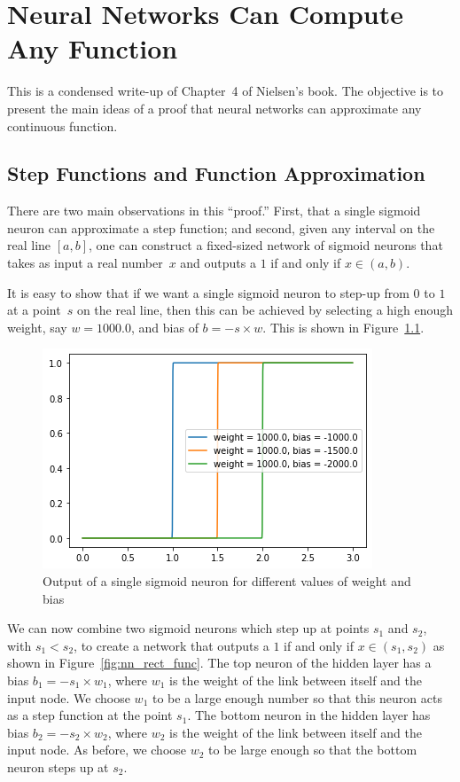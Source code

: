 \chapter{Neural Networks Can Compute Any Function}


This is a condensed write-up of Chapter~4 of Nielsen's book. The objective is 
to present the main ideas of a proof that neural networks can approximate 
any continuous function.

\section{Step Functions and Function Approximation}

There are two main observations in this ``proof.'' First, that a single 
sigmoid neuron can approximate a step function; and second, given 
any interval on the real line $[a, b]$, one can construct a 
fixed-sized network of sigmoid neurons that takes as input a real 
number~$x$ and outputs a $1$ if and only if $x \in (a, b)$. 

It is easy to show that if we want a single sigmoid neuron to step-up 
from $0$ to $1$ at a point~$s$ on the real line, then this can be 
achieved by selecting a high enough weight, say $w = 1000.0$, 
and bias of $b = - s \times w$. This is shown in 
Figure~\ref{fig:nn_step_functions}.
\begin{figure}[ht]
\begin{center}
\includegraphics[scale=0.6]{stepfunctions.png}
\end{center}
\caption{Output of a single sigmoid neuron for different values of weight and bias}
\label{fig:nn_step_functions}
\end{figure}

We can now combine two sigmoid neurons which step up at points $s_1$ and $s_2$,
with $s_1 < s_2$, to create a network that outputs a $1$ if and only if $x \in
(s_1, s_2)$ as shown in Figure~\ref{fig:nn_rect_func}. The top neuron of the
hidden layer has a bias $b_1 = - s_1 \times w_1$, where $w_1$ is the weight of
the link between itself and the input node. We choose $w_1$ to be a large
enough number so that this neuron acts as a step function at the point $s_1$.
The bottom neuron in the hidden layer has bias $b_2 = - s_2 \times w_2$, where
$w_2$ is the weight of the link between itself and the input node. As before,
we choose $w_2$ to be large enough so that the bottom neuron steps up at $s_2$. 

